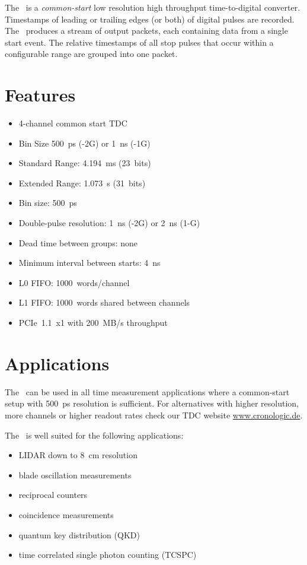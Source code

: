 The \deviceName\ is a \emph{common-start} low resolution high throughput time-to-digital converter. 
Timestamps of leading or trailing edges (or both) of digital pulses are recorded. 
The \deviceName\ produces a stream of output packets, each containing data from a single start event. 
The relative timestamps of all stop pulses that occur within a configurable range are grouped into one packet.

\section{Features}
	\begin{itemize}
		\item 4-channel common start TDC
		\item Bin Size 500~ps (-2G) or 1~ns (-1G)
		\item Standard Range: 4.194~ms (23~bits)
		\item Extended Range: 1.073~s (31~bits)
		\item Bin size: 500~ps
		\item Double-pulse resolution: 1~ns (-2G) or 2~ns (1-G)
		\item Dead time between groups: none
		\item Minimum interval between starts: 4~ns
		\item L0 FIFO: 1000~words/channel
		\item L1 FIFO: 1000~words shared between channels
		\item PCIe~1.1~x1 with 200~MB/s throughput
	\end{itemize} 

\section{Applications}
	The \deviceName\  can be used in all time measurement applications where a common-start setup with 500~ps resolution is sufficient. 
	For alternatives with higher resolution, more channels or higher readout rates check our TDC website \href{https://www.cronologic.de/produkte/products-overview#tdcdata}{www.cronologic.de}.

	The \deviceName\ is well suited for the following applications:
	\begin{itemize}
		\item LIDAR down to 8~cm resolution
		\item blade oscillation measurements
		\item reciprocal counters
		\item coincidence measurements
		\item quantum key distribution (QKD)
		\item time correlated single photon counting (TCSPC)
	\end{itemize} 
